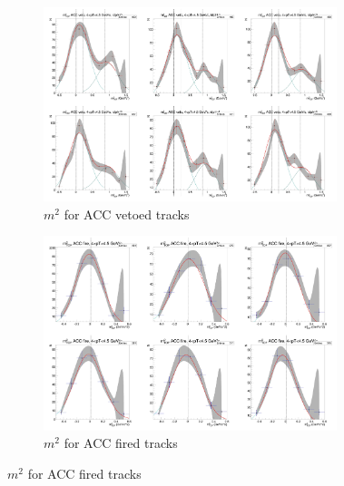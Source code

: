 \begin{figure}[H]
  \ContinuedFloat
    \begin{subfigure}{1\textwidth}
   \centering
   \includegraphics[width=0.94\textwidth]{hiptfits/neg/PSm2_cent0_ich0_accfire0_ptbin14.jpg}
    \caption{$m^2$ for ACC vetoed tracks}
    \end{subfigure}
    \begin{subfigure}{1\textwidth}
   \centering
   \includegraphics[width=0.94\textwidth]{hiptfits/neg/PSm2_cent0_ich0_accfire1_ptbin14.jpg}
    \caption{$m^2$ for ACC fired tracks}
    \end{subfigure}  
\end{figure}
